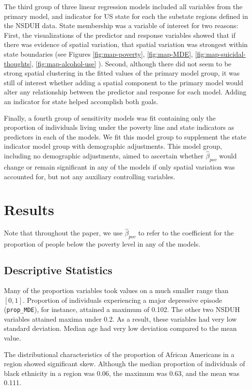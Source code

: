 \documentclass{article}
\begin{document}
The third group of three linear regression models included all variables
from the primary model,
and indicator for US state for each the
substate regions defined in the NSDUH data.
State membership was a variable of interest for two
reasons:
First, the visualizations of the predictor and response variables
showed that if there was evidence of spatial variation,
that spatial variation was strongest within state boundaries
(see Figures
\ref{fig:map-poverty},
\ref{fig:map-MDE},
\ref{fig:map-suicidal-thoughts},
\ref{fig:map-alcohol-use}
).
Second, although there did not seem to be strong spatial
clustering in the fitted values of the primary model group,
it was still of interest whether adding a spatial component to
the primary model would alter any relationship between
the predictor and response for each model.
Adding an indicator for state helped accomplish both goals.

Finally, a fourth group of sensitivity models was fit
containing only the proportion of individuals living
under the poverty line and state indicators as predictors
in each of the models.
We fit this model group to supplement the state indicator
model group with demographic adjustments.
This model group, including no demographic adjustments,
aimed to ascertain whether
$\hat{\beta}_{pov}$ would change or remain significant
in any of the models
if only spatial variation was accounted for,
but not any auxiliary controlling variables.

\section{Results}

Note that throughout the paper,
we use $\hat{\beta}_{pov}$ to refer to the
coefficient for the proportion of people below the poverty level in any of the
models.

\subsection{Descriptive Statistics}

Many of the proportion variables took values on a much smaller range
than $[0,1]$.
Proportion of individuals experiencing a major depressive episode
(\texttt{prop\_MDE}),
for instance, attained a maximum of 0.102.
The other two NSDUH variables attained maxima under 0.2.
As a result, these variables had very low standard deviation.
Median age had very low deviation compared to the mean value.

The distributional characteristics of the proportion of African Americans
in a region showed significant skew.
Although the median proportion of individuals of 
black ethnicity in a region was 0.06,
the maximum was 0.63, and the mean was 0.111.
\end{document}
